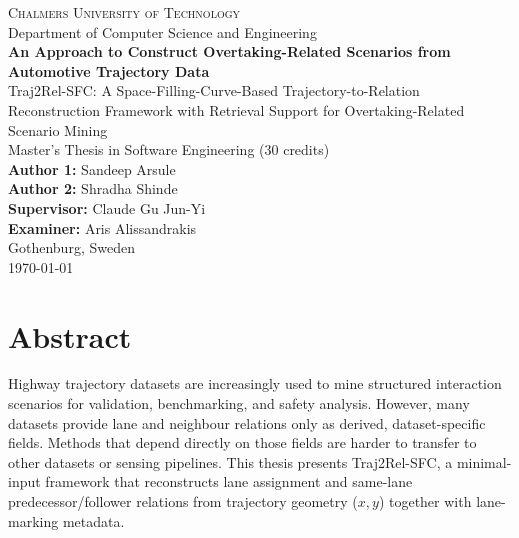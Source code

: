 \documentclass[12pt,a4paper,twoside,openright]{report}
\newcommand{\ThesisTitle}{An Approach to Construct Overtaking-Related Scenarios from Automotive Trajectory Data}
\newcommand{\FrameworkName}{Traj2Rel-SFC}
\newcommand{\ThesisSubtitle}{\FrameworkName: A Space-Filling-Curve-Based Trajectory-to-Relation Reconstruction Framework with Retrieval Support for Overtaking-Related Scenario Mining}
\newcommand{\AuthorOne}{Sandeep Arsule}
\newcommand{\AuthorTwo}{Shradha Shinde}
\newcommand{\SupervisorName}{Claude Gu Jun-Yi}
\newcommand{\ExaminerName}{Aris Alissandrakis}
\newcommand{\UniversityName}{Chalmers University of Technology}
\newcommand{\DepartmentName}{Department of Computer Science and Engineering}
\newcommand{\CityCountry}{Gothenburg, Sweden}
\newcommand{\ThesisDate}{\today}
\begin{document}

    \begin{titlepage}
        \thispagestyle{empty}
        \vspace*{2cm}

        \begin{center}
            {\Large \textsc{\UniversityName}}\\[0.5cm]
            {\large \DepartmentName}\\[2.0cm]

        {\huge \bfseries \ThesisTitle}\\[0.6cm]
        {\Large \ThesisSubtitle}\\[2.0cm]

        {\large Master's Thesis in Software Engineering (30 credits)}\\[1.2cm]

        {\large
        \textbf{Author 1:} \AuthorOne\\
        \textbf{Author 2:} \AuthorTwo
        }\\[1.2cm]

        {\large
        \textbf{Supervisor:} \SupervisorName\\
        \textbf{Examiner:} \ExaminerName
        }\\[1.6cm]

        {\large \CityCountry}\\
        {\large \ThesisDate}
        \end{center}

        \vfill
    \end{titlepage}

    \cleardoublepage
    \chapter*{Abstract}

    Highway trajectory datasets are increasingly used to mine structured interaction scenarios for validation, benchmarking, and safety analysis. However, many datasets provide lane and neighbour relations only as derived, dataset-specific fields. Methods that depend directly on those fields are harder to transfer to other datasets or sensing pipelines. This thesis presents \FrameworkName{}, a minimal-input framework that reconstructs lane assignment and same-lane predecessor/follower relations from trajectory geometry ($x,y$) together with lane-marking metadata.
\end{document}
